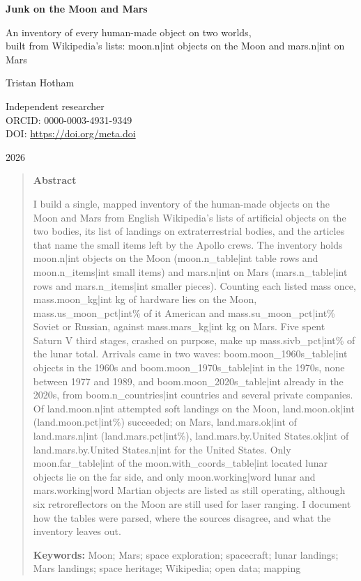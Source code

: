 \documentclass[11pt,a4paper]{article}
\begin{document}
\begin{center}
{\Large\bfseries Junk on the Moon and Mars\par}
\vspace{0.4em}
{\large An inventory of every human-made object on two worlds,\\built from Wikipedia's lists: {{moon.n|int}} objects on the Moon and {{mars.n|int}} on Mars\par}
\vspace{1.2em}
{\large Tristan Hotham\par}
\vspace{0.3em}
{\small Independent researcher\\
ORCID: 0000-0003-4931-9349\\
DOI: \href{https://doi.org/{{meta.doi}}}{https://doi.org/{{meta.doi}}}\par}
\vspace{0.8em}
2026
\end{center}

\begin{quote}
\small
\begin{center}\textbf{Abstract}\end{center}
I build a single, mapped inventory of the human-made objects on the Moon and Mars from English Wikipedia's lists of artificial objects on the two bodies, its list of landings on extraterrestrial bodies, and the articles that name the small items left by the Apollo crews. The inventory holds {{moon.n|int}} objects on the Moon ({{moon.n_table|int}} table rows and {{moon.n_items|int}} small items) and {{mars.n|int}} on Mars ({{mars.n_table|int}} rows and {{mars.n_items|int}} smaller pieces). Counting each listed mass once, {{mass.moon_kg|int}} kg of hardware lies on the Moon, {{mass.us_moon_pct|int}}\% of it American and {{mass.su_moon_pct|int}}\% Soviet or Russian, against {{mass.mars_kg|int}} kg on Mars. Five spent Saturn V third stages, crashed on purpose, make up {{mass.sivb_pct|int}}\% of the lunar total. Arrivals came in two waves: {{boom.moon_1960s_table|int}} objects in the 1960s and {{boom.moon_1970s_table|int}} in the 1970s, none between 1977 and 1989, and {{boom.moon_2020s_table|int}} already in the 2020s, from {{boom.n_countries|int}} countries and several private companies. Of {{land.moon.n|int}} attempted soft landings on the Moon, {{land.moon.ok|int}} ({{land.moon.pct|int}}\%) succeeded; on Mars, {{land.mars.ok|int}} of {{land.mars.n|int}} ({{land.mars.pct|int}}\%), {{land.mars.by.United States.ok|int}} of {{land.mars.by.United States.n|int}} for the United States. Only {{moon.far_table|int}} of the {{moon.with_coords_table|int}} located lunar objects lie on the far side, and only {{moon.working|word}} lunar and {{mars.working|word}} Martian objects are listed as still operating, although six retroreflectors on the Moon are still used for laser ranging. I document how the tables were parsed, where the sources disagree, and what the inventory leaves out.

\textbf{Keywords:} Moon; Mars; space exploration; spacecraft; lunar landings; Mars landings; space heritage; Wikipedia; open data; mapping
\end{quote}
\end{document}
